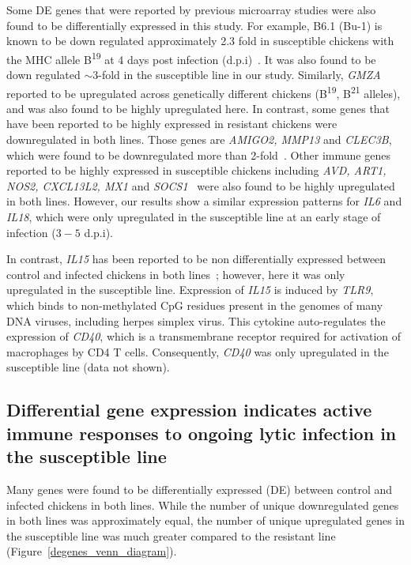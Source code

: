 Some DE genes that were reported by previous microarray studies were
also found to be differentially expressed in this study.  For example,
B6.1 (Bu-1) is known to be down regulated approximately 2.3 fold in
susceptible chickens with the MHC allele B\textsuperscript{19} at 4
days post infection (d.p.i)~\cite{sarson2008transcriptional}.  It was
also found to be down regulated $\sim$3-fold in the susceptible line
in our study.  Similarly, {\em GMZA} reported to be upregulated across
genetically different chickens (B\textsuperscript{19},
B\textsuperscript{21} alleles), and was also found to be highly
upregulated here.  In contrast, some genes that have been reported to
be highly expressed in resistant chickens were downregulated in both
lines. Those genes are {\em AMIGO2, MMP13} and {\em CLEC3B}, which
were found to be downregulated more than
2-fold~\cite{sarson2008transcriptional}.
Other immune genes reported to be highly expressed in susceptible
chickens including {\em AVD, ART1, NOS2, CXCL13L2, MX1} and {\em
SOCS1}~\cite{smith2011systems} were also found to be highly
upregulated in both lines.  However, our results show a similar
expression patterns for {\em IL6} and {\em IL18}, which were only
upregulated in the susceptible line at an early stage of infection
($3-5$ d.p.i).

In contrast, {\em IL15} has been reported to be non
differentially expressed between control and infected chickens in
both lines~\cite{kaiser2003differential}; however, here it was only
upregulated in the susceptible line.  Expression of {\em IL15} is
induced by {\em TLR9}, which binds to non-methylated CpG residues
present in the genomes of many DNA viruses, including herpes simplex
virus.  This cytokine auto-regulates the expression of {\em
CD40}, which is a transmembrane receptor required for activation
of macrophages by CD4 T cells.  Consequently, {\em CD40} was only
upregulated in the susceptible line (data not shown).

\subsection{Differential gene expression indicates active immune
responses to ongoing lytic infection in the susceptible line}

Many genes were found to be differentially expressed (DE) between
control and infected chickens in both lines.  While the number of
unique downregulated genes in both lines was approximately equal,
the number of unique upregulated genes in the susceptible line
was much greater compared to the resistant line
(Figure~\ref{degenes_venn_diagram}).

